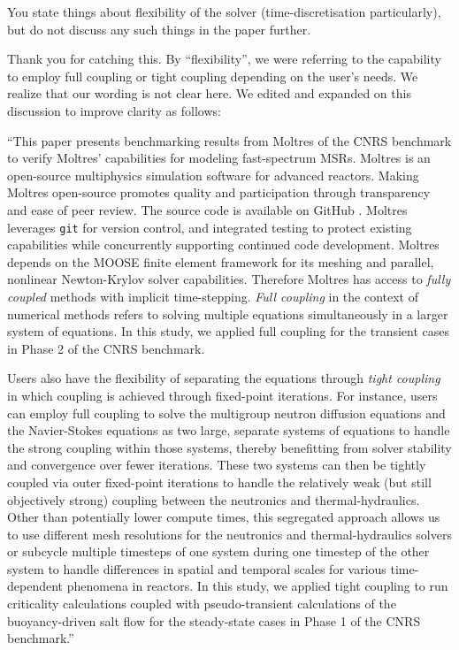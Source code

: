 \documentclass[answers,11pt]{exam}
\begin{document}
\begin{questions}
        \question You state things about flexibility of the solver
        (time-discretisation particularly), but do not discuss any such things
        in the paper further.
        \begin{solution}
        	Thank you for catching this. By ``flexibility'', we were referring
        	to the capability to employ full coupling or tight coupling
        	depending on the user's needs. We realize that our wording is not
        	clear here. We edited and expanded on this discussion to improve
        	clarity as follows:
        	
        	``This paper presents benchmarking results from Moltres of the CNRS benchmark
to verify Moltres' capabilities for modeling fast-spectrum \glspl{MSR}. Moltres
is an open-source multiphysics simulation software for advanced reactors.
Making Moltres open-source promotes quality and participation through
transparency and ease of peer review. The source code
\cite{lindsay_moltres_2017} is available on GitHub \cite{github_build_2017}.
Moltres leverages \texttt{git} for version control, and integrated testing to
protect existing capabilities while concurrently supporting continued code
development. Moltres depends on the MOOSE finite element framework for
its meshing and parallel, nonlinear Newton-Krylov solver capabilities.
Therefore Moltres has access to \textit{fully coupled} methods with implicit
time-stepping. \textit{Full coupling} in the context of numerical methods
refers to solving multiple equations simultaneously in a larger system of
equations. In this study, we applied full coupling for the transient
cases in Phase 2 of the CNRS benchmark.

Users also have the flexibility of separating the equations through
\textit{tight coupling} in which coupling is achieved through
fixed-point iterations. For instance, users can employ full coupling to solve
the multigroup neutron diffusion equations and the Navier-Stokes equations as
two large, separate systems of equations to handle the strong coupling within
those systems, thereby benefitting from solver stability and convergence
over fewer iterations. These two systems can then be tightly coupled via outer
fixed-point iterations to handle the relatively weak (but still objectively
strong) coupling between the neutronics and thermal-hydraulics. Other than
potentially lower compute times, this segregated approach allows us to use
different mesh resolutions for the neutronics and thermal-hydraulics solvers
or subcycle multiple timesteps of one system during one timestep of the other
system to handle differences in spatial and temporal scales for various
time-dependent phenomena in reactors. In this study, we applied tight coupling
to run criticality calculations coupled with pseudo-transient calculations of
the buoyancy-driven salt flow for the steady-state cases in Phase 1 of the CNRS
benchmark.''
        \end{solution}


\end{questions}
\end{document}

